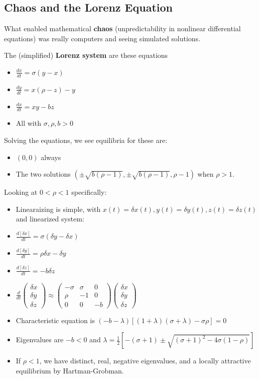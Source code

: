 \documentclass[11pt, oneside]{article}   	%
\begin{document}
\subsection{Chaos and the Lorenz Equation}

What enabled mathematical \textbf{chaos} (unpredictability in nonlinear differential equations) was really computers and seeing simulated solutions.

The (simplified) \textbf{Lorenz system} are these equations
\begin{itemize}
\item $\frac{dx}{dt} = \sigma (y-x)$
\item $\frac{dy}{dt} = x(\rho - z) - y$
\item $\frac{dx}{dt} = xy-bz$
\item All with $\sigma, \rho, b > 0$
\end{itemize}

Solving the equations, we see equilibria for these are:
\begin{itemize}
\item $(0,0)$ always
\item The two solutions $(\pm \sqrt{b(\rho - 1)}, \pm \sqrt{b(\rho - 1)}, \rho - 1)$ when $\rho > 1$.
\end{itemize}

Looking at $0 < \rho < 1$ specifically:
\begin{itemize}
\item Linearaizing is simple, with $x(t)= \delta x(t), y(t)= \delta y(t), z(t)= \delta z(t)$ and linearized system:
\item $\frac{d[\delta x]}{dt} = \sigma(\delta y - \delta x)$
\item $\frac{d[\delta y]}{dt} = \rho \delta x - \delta y$
\item $\frac{d[\delta z]}{dt} = -b \delta z$
\item
 $\frac{d}{dt} \begin{pmatrix} \delta x \\ \delta y \\ \delta z  \end{pmatrix} \approx  \begin{pmatrix} -\sigma & \sigma & 0 \\
 \rho & -1 & 0 \\ 0 & 0 & -b \end{pmatrix}  \begin{pmatrix} \delta x \\ \delta y \\ \delta z  \end{pmatrix} $
 \item Characteristic equation is $(-b - \lambda)[(1+\lambda)(\sigma + \lambda) - \sigma \rho]  = 0$
 \item Eigenvalues are $-b < 0$ and $\lambda = \frac{1}{2}[-(\sigma + 1) \pm \sqrt{(\sigma + 1)^2 - 4\sigma (1-\rho)}]$
 \item If $\rho < 1$, we have distinct, real, negative eigenvalues, and a locally attractive equilibrium by Hartman-Grobman.
\end{itemize}
\end{document}
